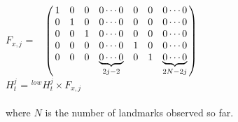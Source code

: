 \documentclass{ba-kecs}
\numberwithin{figure}{section}
\numberwithin{equation}{section}
\begin{document}
$F_{x,j}$ = $\bordermatrix{~ \cr
                        & 1 & 0 & 0 & 0 \cdots 0 & 0 & 0 & 0 \cdots 0 \cr
                        & 0 & 1 & 0 & 0 \cdots 0 & 0 & 0 & 0 \cdots 0 \cr
                        & 0 & 0 & 1 & 0 \cdots 0 & 0 & 0 & 0 \cdots 0 \cr
                        & 0 & 0 & 0 & 0 \cdots 0 & 1 & 0 & 0 \cdots 0 \cr
                        & 0 & 0 & 0 & \underbrace{0 \cdots 0}_{2j-2} & 0 & 1 & \underbrace{0 \cdots 0}_{2N-2j} \cr}$ \\
                                                  
$H^{j}_{t}$ = $^{low}H^{j}_{t} \times F_{x,j}$ \\ \\
where $N$ is the number of landmarks observed so far.
\end{document}
